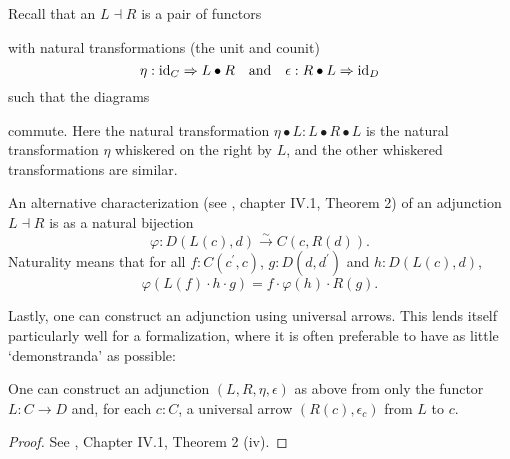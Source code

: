 Recall that an  $ L \dashv R $ is a pair of functors
\begin{center}
\end{center}
with natural transformations (the unit and counit)
\[ \eta: \text{id}_{C} \Rightarrow L \bullet R \quad \text{and} \quad \epsilon: R \bullet L \Rightarrow \text{id}_{D} \]
such that the diagrams
\begin{center}
  \qquad
\end{center}
commute. Here the natural transformation $ \eta \bullet L: L \bullet R \bullet L $ is the natural transformation $ \eta $ whiskered on the right by $ L $, and the other whiskered transformations are similar.

An alternative characterization (see \cite{MacLane}, chapter IV.1, Theorem 2) of an adjunction $ L \dashv R $ is as a natural bijection
\[ \varphi: D(L(c), d) \xrightarrow{\sim} C(c, R(d)). \]
Naturality means that for all $ f: C(c^\prime, c) $, $ g: D(d, d^\prime) $ and $ h: D(L(c), d) $,
\[ \varphi(L(f) \cdot h \cdot g) = f \cdot \varphi(h) \cdot R(g). \]

Lastly, one can construct an adjunction using universal arrows. This lends itself particularly well for a formalization, where it is often preferable to have as little `demonstranda' as possible:
\begin{lemma}
  One can construct an adjunction $ (L, R, \eta, \epsilon) $ as above from only the functor $ L: C \to D $ and, for each $ c: C $, a universal arrow $ (R(c), \epsilon_c) $ from $ L $ to $ c $.
\end{lemma}
\begin{proof}
  See \cite{MacLane}, Chapter IV.1, Theorem 2 (iv).
\end{proof}

